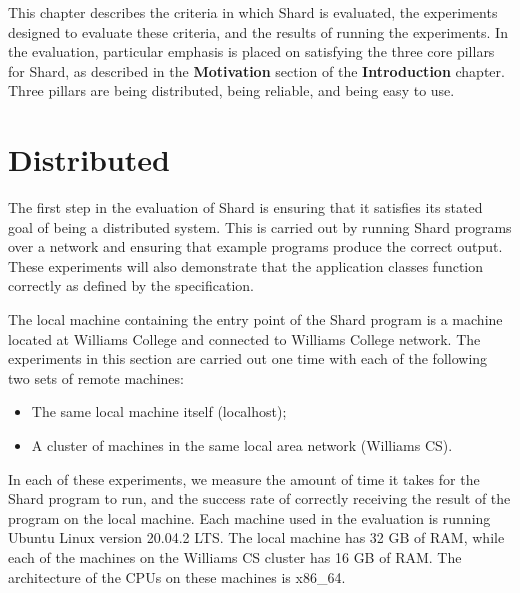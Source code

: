 \documentclass[oneside]{report}
\newcommand{\todoi}[1]{\todo[inline, color=blue!20]{TODO: {#1}}}
\begin{document}
This chapter describes the criteria in which Shard is evaluated, the experiments designed to evaluate these criteria, and the results of running the experiments.
In the evaluation, particular emphasis is placed on satisfying the three core pillars for Shard, as described in the \textbf{Motivation} section of the \textbf{Introduction} chapter.
Three pillars are being distributed, being reliable, and being easy to use.

\section{Distributed}

The first step in the evaluation of Shard is ensuring that it satisfies its stated goal of being a distributed system.
This is carried out by running Shard programs over a network and ensuring that example programs produce the correct output.
These experiments will also demonstrate that the application classes function correctly as defined by the specification.

The local machine containing the entry point of the Shard program is a machine located at Williams College and connected to Williams College network.
The experiments in this section are carried out one time with each of the following two sets of remote machines:
\begin{itemize}
  \item The same local machine itself (localhost);
  \item A cluster of machines in the same local area network (Williams CS).
\end{itemize}
In each of these experiments, we measure the amount of time it takes for the Shard program to run, and the success rate of correctly receiving the result of the program on the local machine.
Each machine used in the evaluation is running Ubuntu Linux version 20.04.2 LTS.
The local machine has 32 GB of RAM, while each of the machines on the Williams CS cluster has 16 GB of RAM.
The architecture of the CPUs on these machines is x86\_64.
\end{document}
